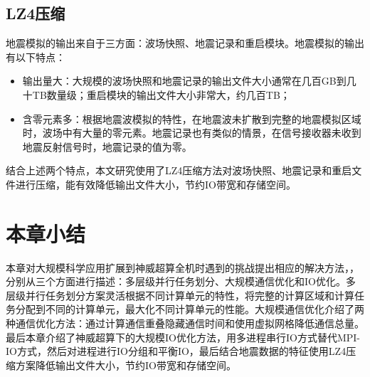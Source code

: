\subsection{LZ4压缩}

地震模拟的输出来自于三方面：波场快照、地震记录和重启模块。地震模拟的输出有以下特点：
\begin{itemize}
  \item 输出量大：大规模的波场快照和地震记录的输出文件大小通常在几百GB到几十TB数量级；重启模块的输出文件大小非常大，约几百TB；
  \item 含零元素多：根据地震波模拟的特性，在地震波未扩散到完整的地震模拟区域时，波场中有大量的零元素。地震记录也有类似的情景，在信号接收器未收到地震反射信号时，地震记录的值为零。
\end{itemize}

结合上述两个特点，本文研究使用了LZ4压缩方法对波场快照、地震记录和重启文件进行压缩，能有效降低输出文件大小，节约IO带宽和存储空间。

\section{本章小结}

本章对大规模科学应用扩展到神威超算全机时遇到的挑战提出相应的解决方法，，分别从三个方面进行描述：多层级并行任务划分、大规模通信优化和IO优化。多层级并行任务划分方案灵活根据不同计算单元的特性，将完整的计算区域和计算任务分配到不同的计算单元，最大化不同计算单元的性能。大规模通信优化介绍了两种通信优化方法：通过计算通信重叠隐藏通信时间和使用虚拟网格降低通信总量。最后本章介绍了神威超算下的大规模IO优化方法，用多进程串行IO方式替代MPI-IO方式，然后对进程进行IO分组和平衡IO，最后结合地震数据的特征使用LZ4压缩方案降低输出文件大小，节约IO带宽和存储空间。

